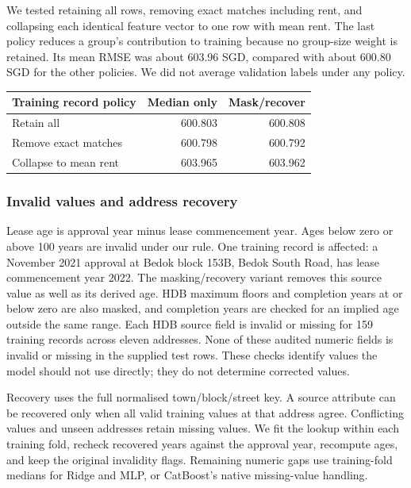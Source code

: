 \documentclass[conference]{IEEEtran}
\makeatletter
\newenvironment{localtable}{\par\addvspace{\medskipamount}\noindent
  \begin{minipage}{\columnwidth}\def\@captype{table}}{\end{minipage}\par
  \addvspace{\medskipamount}}
\makeatother
\begin{document}
We tested retaining all rows, removing exact matches including rent, and
collapsing each identical feature vector to one row with mean rent. The last
policy reduces a group's contribution to training because no group-size
weight is retained. Its mean RMSE was about 603.96 SGD, compared with about
600.80 SGD for the other policies. We did not average validation labels under
any policy.

\begin{localtable}
  \caption{Training-policy and missing-value audit. Mean RMSE in SGD over the two
  earlier selection windows; validation observations are identical for all rows.}
  \label{tab:audit_policies}
  \centering
  \small
  \begin{tabularx}{\columnwidth}{Xrr}
    \toprule
    Training record policy & Median only & Mask/recover \\
    \midrule
    Retain all & 600.803 & 600.808 \\
    Remove exact matches & 600.798 & 600.792 \\
    Collapse to mean rent & 603.965 & 603.962 \\
    \bottomrule
  \end{tabularx}
\end{localtable}

\subsubsection{Invalid values and address recovery}
Lease age is approval year minus lease commencement year. Ages below zero or
above 100 years are invalid under our rule. One training record is affected:
a November 2021 approval at Bedok block 153B, Bedok South Road, has lease
commencement year 2022. The masking/recovery variant removes this source value
as well as its derived age. HDB maximum floors and completion years at or
below zero are also masked, and completion years are checked for an implied
age outside the same range. Each HDB source field is invalid or missing for
159 training records across eleven addresses. None of these audited numeric
fields is invalid or missing in the supplied test rows. These checks identify
values the model should not use directly; they do not determine corrected
values.

Recovery uses the full normalised town/block/street key. A source attribute
can be recovered only when all valid training values at that address agree.
Conflicting values and unseen addresses retain missing values. We fit the
lookup within each training fold, recheck recovered years against the
approval year, recompute ages, and keep the original invalidity flags.
Remaining numeric gaps use training-fold medians for Ridge and MLP, or
CatBoost's native missing-value handling.
\end{document}
